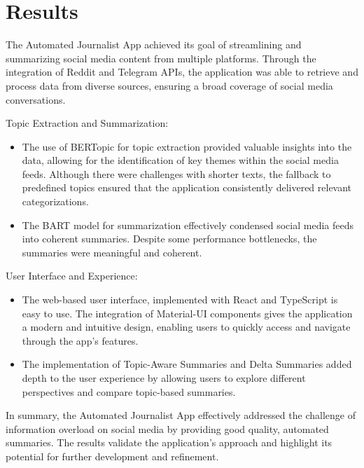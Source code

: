 \section{Results}\label{sec:results}

The Automated Journalist App achieved its goal of streamlining and summarizing social media content from multiple platforms. Through the integration of Reddit and Telegram APIs, the application was able to retrieve and process data from diverse sources, ensuring a broad coverage of social media conversations.

Topic Extraction and Summarization:
\begin{itemize}
    \item The use of BERTopic for topic extraction provided valuable insights into the data, allowing for the identification of key themes within the social media feeds. Although there were challenges with shorter texts, the fallback to predefined topics ensured that the application consistently delivered relevant categorizations.
\end{itemize}
\begin{itemize}
    \item The BART model for summarization effectively condensed social media feeds into coherent summaries. Despite some performance bottlenecks, the summaries were meaningful and coherent.
\end{itemize}

User Interface and Experience:
\begin{itemize}
    \item The web-based user interface, implemented with React and TypeScript is easy to use. The integration of Material-UI components gives the application a modern and intuitive design, enabling users to quickly access and navigate through the app's features.
\end{itemize}
\begin{itemize}
    \item The implementation of Topic-Aware Summaries and Delta Summaries added depth to the user experience by allowing users to explore different perspectives and compare topic-based summaries.
\end{itemize}

In summary, the Automated Journalist App effectively addressed the challenge of information overload on social media by providing good quality, automated summaries. The results validate the application's approach and highlight its potential for further development and refinement.
